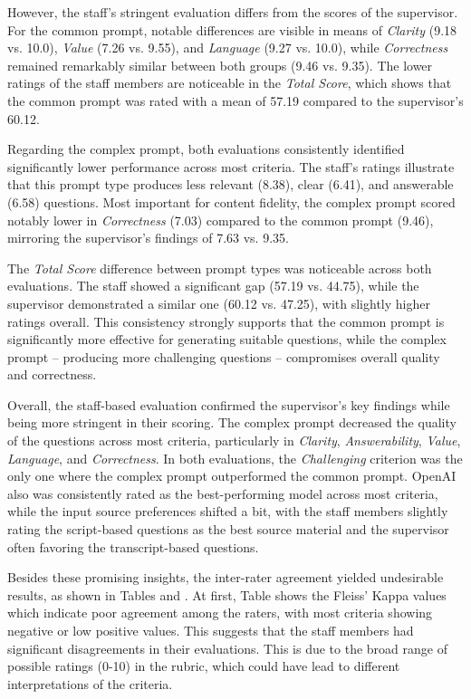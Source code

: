 However, the staff's stringent evaluation differs from the scores of the supervisor. For the common prompt, notable differences are visible in means of \textit{Clarity} (9.18 vs. 10.0), \textit{Value} (7.26 vs. 9.55), and \textit{Language} (9.27 vs. 10.0), while \textit{Correctness} remained remarkably similar between both groups (9.46 vs. 9.35). The lower ratings of the staff members are noticeable in the \textit{Total Score}, which shows that the common prompt was rated with a mean of 57.19 compared to the supervisor's 60.12.

Regarding the complex prompt, both evaluations consistently identified significantly lower performance across most criteria. The staff's ratings illustrate that this prompt type produces less relevant (8.38), clear (6.41), and answerable (6.58) questions. Most important for content fidelity, the complex prompt scored notably lower in \textit{Correctness} (7.03) compared to the common prompt (9.46), mirroring the supervisor's findings of 7.63 vs. 9.35.

The \textit{Total Score} difference between prompt types was noticeable across both evaluations. The staff showed a significant gap (57.19 vs. 44.75), while the supervisor demonstrated a similar one (60.12 vs. 47.25), with slightly higher ratings overall. This consistency strongly supports that the common prompt is significantly more effective for generating suitable questions, while the complex prompt -- producing more challenging questions -- compromises overall quality and correctness.

Overall, the staff-based evaluation confirmed the supervisor's key findings while being more stringent in their scoring. The complex prompt decreased the quality of the questions across most criteria, particularly in \textit{Clarity}, \textit{Answerability}, \textit{Value}, \textit{Language}, and \textit{Correctness}. In both evaluations, the \textit{Challenging} criterion was the only one where the complex prompt outperformed the common prompt. OpenAI also was consistently rated as the best-performing model across most criteria, while the input source preferences shifted a bit, with the staff members slightly rating the script-based questions as the best source material and the supervisor often favoring the transcript-based questions.

Besides these promising insights, the inter-rater agreement yielded undesirable results, as shown in Tables  and . At first, Table  shows the Fleiss' Kappa values which indicate poor agreement among the raters, with most criteria showing negative or low positive values. This suggests that the staff members had significant disagreements in their evaluations. This is due to the broad range of possible ratings (0-10) in the rubric, which could have lead to different interpretations of the criteria. 

